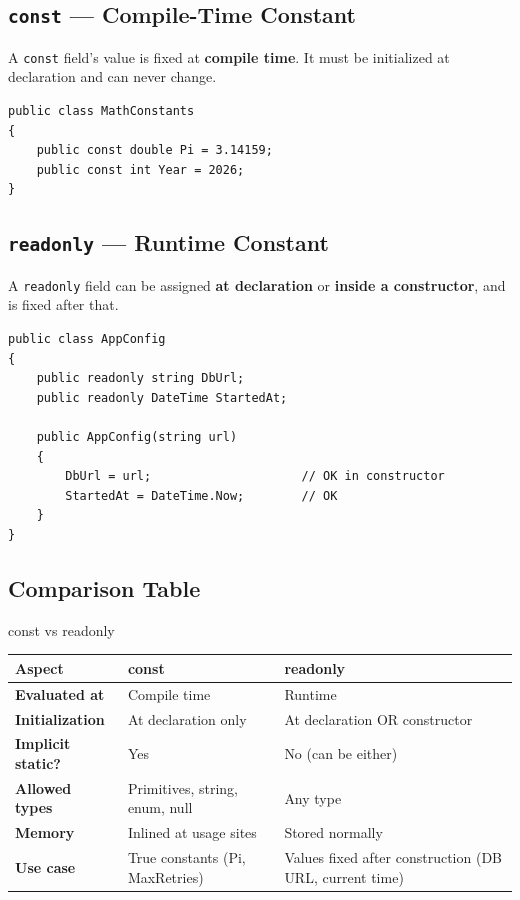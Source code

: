 \documentclass[11pt,a4paper]{article}
\newcommand{\rowcolortop}{\rowcolor{tableHead}\color{white}\bfseries}
\newcommand{\rowcolorlight}{\rowcolor{tableAlt}}
\begin{document}
\subsection{\texttt{const} — Compile-Time Constant}

A \texttt{const} field's value is fixed at \textbf{compile time}. It must be initialized at declaration and can never change.

\begin{lstlisting}
public class MathConstants
{
    public const double Pi = 3.14159;
    public const int Year = 2026;
}
\end{lstlisting}

\subsection{\texttt{readonly} — Runtime Constant}

A \texttt{readonly} field can be assigned \textbf{at declaration} or \textbf{inside a constructor}, and is fixed after that.

\begin{lstlisting}
public class AppConfig
{
    public readonly string DbUrl;
    public readonly DateTime StartedAt;

    public AppConfig(string url)
    {
        DbUrl = url;                     // OK in constructor
        StartedAt = DateTime.Now;        // OK
    }
}
\end{lstlisting}

\subsection{Comparison Table}

\begin{compareBox}{const vs readonly}
\begin{tabularx}{\linewidth}{|>{\bfseries}p{3.5cm}|X|X|}
\hline
\rowcolortop \color{white}Aspect & \color{white}const & \color{white}readonly \\
\hline
Evaluated at  & Compile time & Runtime \\
\rowcolorlight
Initialization & At declaration only & At declaration OR constructor \\
Implicit static? & Yes & No (can be either) \\
\rowcolorlight
Allowed types & Primitives, string, enum, null & Any type \\
Memory   & Inlined at usage sites & Stored normally \\
\rowcolorlight
Use case & True constants (Pi, MaxRetries) & Values fixed after construction (DB URL, current time) \\
\hline
\end{tabularx}
\end{compareBox}
\end{document}
